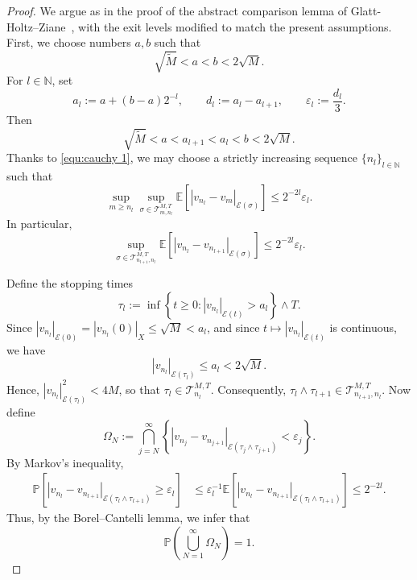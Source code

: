 \documentclass[11pt, reqno]{amsart}
\theoremstyle{definition}
\numberwithin{equation}{section}
\newcommand{\abs}[1]{\left|{#1}\right|}
\begin{document}
\begin{proof}
	We argue as in the proof of the abstract comparison lemma of
	Glatt-Holtz--Ziane~\cite{GlaZia09}, with the exit levels modified to match the present assumptions.
	First, we choose numbers $a,b$ such that
	\[
	\sqrt{\widetilde M}<a<b<2\sqrt M .
	\]
	For $l\in\mathbb N$, set
	\[
	a_l:=a+(b-a)2^{-l},
	\qquad
	d_l:=a_l-a_{l+1},
	\qquad
	\varepsilon_l:=\frac{d_l}{3}.
	\]
	Then
	\[
	\sqrt{\widetilde M}<a<a_{l+1}<a_l<b<2\sqrt M .
	\]
	Thanks to \eqref{equ:cauchy 1}, we may choose a strictly increasing sequence
	$\{n_l\}_{l\in\mathbb N}$ such that
	\[
	\sup_{m\geq n_l}
	\sup_{\sigma\in\mathcal T_{m,n_l}^{M,T}}
	\mathbb E
	\left[
	\abs{v_{n_l}-v_m}_{\mathcal E(\sigma)}
	\right]
	\leq
	2^{-2l}\varepsilon_l .
	\]
	In particular,
	\[
	\sup_{\sigma \in \mathcal T_{n_{l+1},n_{l}}^{M,T}} 
	\mathbb E
	\left[
	\abs{v_{n_l}-v_{n_{l+1}}}_{\mathcal E(\sigma)}
	\right]
	\leq
	2^{-2l}\varepsilon_l.
	\]
	
	Define the stopping times
	\[
	\tau_l
	:=
	\inf\left\{
	t\geq 0:
	\abs{v_{n_l}}_{\mathcal E(t)}>a_l
	\right\}\wedge T .
	\]
	Since $\abs{v_{n_l}}_{\mathcal E(0)}
	=
	\abs{v_{n_l}(0)}_X
	\leq \sqrt M
	<
	a_l$, and since $t\mapsto \abs{v_{n_l}}_{\mathcal E(t)}$ is continuous, we have
	\[
	\abs{v_{n_l}}_{\mathcal E(\tau_l)}\leq a_l<2\sqrt M .
	\]
	Hence, $\abs{v_{n_l}}_{\mathcal E(\tau_l)}^2<4M$, so that $\tau_l\in\mathcal T_{n_l}^{M,T}$. Consequently, $\tau_{l} \wedge\tau_{l+1} \in \mathcal T_{n_{l+1},n_{l}}^{M,T}$.
	Now define
	\begin{equation}\label{equ:Omega N}
	\Omega_N
	:=
	\bigcap_{j=N}^{\infty}
	\left\{
	\abs{v_{n_j}-v_{n_{j+1}}}
	_{\mathcal E(\tau_j\wedge\tau_{j+1})}
	<
	\varepsilon_j
	\right\}.
	\end{equation}
	By Markov's inequality,
	\[
	\begin{aligned}
		\mathbb P\left[
		\abs{v_{n_l}-v_{n_{l+1}}}
		_{\mathcal E(\tau_l\wedge\tau_{l+1})}
		\geq \varepsilon_l
		\right]
		&\leq
		\varepsilon_l^{-1}
		\mathbb E
		\left[
		\abs{v_{n_l}-v_{n_{l+1}}}
		_{\mathcal E(\tau_l\wedge\tau_{l+1})}
		\right]
		\leq
		2^{-2l}.
	\end{aligned}
	\]
	Thus, by the Borel--Cantelli lemma, we infer that
	\[
	\mathbb P\left(\bigcup_{N=1}^{\infty}\Omega_N\right)=1.
	\]
	

\end{proof}
\end{document}

